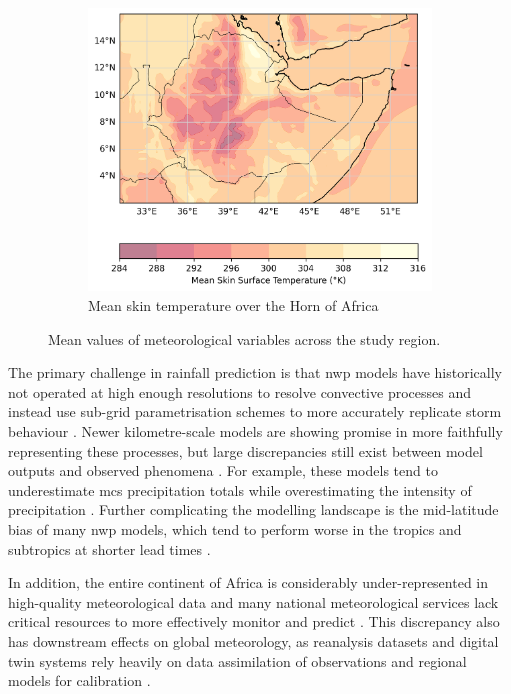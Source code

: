 \begin{figure}[ht]
\begin{subfigure}[t]{0.45\textwidth}
    \label{fig:mean_swvl1}
\end{subfigure}
\hfill
\begin{subfigure}[t]{0.45\textwidth}
    \includegraphics[width=\textwidth]{../figures/generated/exploration/mean_skt.png}
    \caption{Mean skin temperature over the Horn of Africa}
    \label{fig:mean_skt}
\end{subfigure}

\caption{Mean values of meteorological variables across the study region.}
\label{fig:figures}
\end{figure}

The primary challenge in rainfall prediction is that \acrfull{nwp} models have historically not operated at high enough resolutions to resolve convective processes and instead use sub-grid parametrisation schemes to more accurately replicate storm behaviour \citep{Stevens2019,Yano2018}. Newer kilometre-scale models are showing promise in more faithfully representing these processes, but large discrepancies still exist between model outputs and observed phenomena \citep{Feng2025,Yano2018}. For example, these models tend to underestimate \acrshort{mcs} precipitation totals while overestimating the intensity of precipitation \citep{Feng2025,Stevens2019}. Further complicating the modelling landscape is the mid-latitude bias of many \acrshort{nwp} models, which tend to perform worse in the tropics and subtropics at shorter lead times \citep{Keane2025}. 

In addition, the entire continent of Africa is considerably under-represented in high-quality meteorological data and many national meteorological services lack critical resources to more effectively monitor and predict  \citep{Dinku2019,Kinyondo2018,Meque2021}. This discrepancy also has downstream effects on global meteorology, as reanalysis datasets and digital twin systems rely heavily on data assimilation of observations and regional models for calibration \citep{Linsenmeier2023,Valmassoi2023}. 

